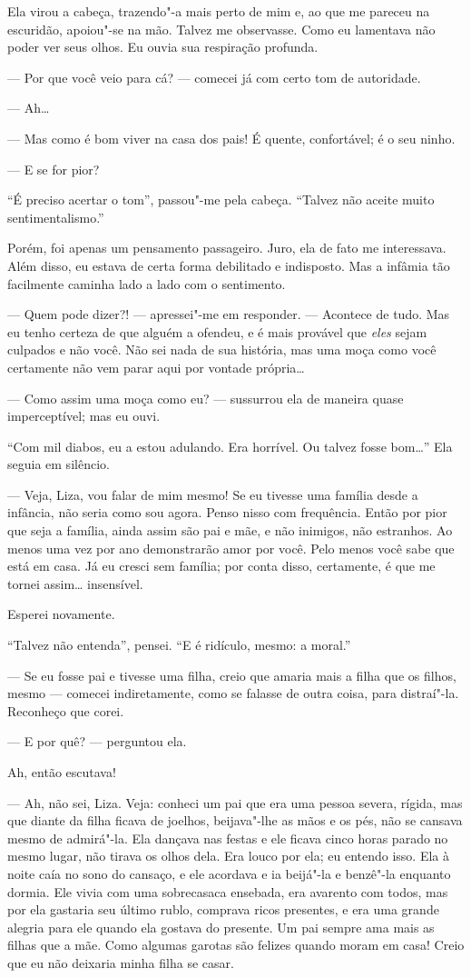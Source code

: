 Ela virou a cabeça, trazendo"-a mais perto de mim e, ao que me pareceu na
escuridão, apoiou"-se na mão. Talvez me observasse. Como eu lamentava
não poder ver seus olhos. Eu ouvia sua respiração profunda.

--- Por que você veio para cá? --- comecei já com certo tom de autoridade.

--- Ah\ldots{}

--- Mas como é bom viver na casa dos pais! É quente, confortável; é o seu
ninho.

--- E se for pior?

“É preciso acertar o tom”, passou"-me pela cabeça. “Talvez não aceite
muito sentimentalismo.”

Porém, foi apenas um pensamento passageiro. Juro, ela de fato me
interessava. Além disso, eu estava de certa forma debilitado e
indisposto. Mas a infâmia tão facilmente caminha lado a lado com o
sentimento.

--- Quem pode dizer?! --- apressei{}"-me em responder. --- Acontece de tudo.
Mas eu tenho certeza de que alguém a ofendeu, e é mais provável que
\textit{eles} sejam culpados e não você. Não sei nada de sua história,
mas uma moça como você certamente não vem parar aqui por vontade
própria\ldots{}

--- Como assim uma moça como eu? --- sussurrou ela de maneira quase
imperceptível; mas eu ouvi.

“Com mil diabos, eu a estou adulando. Era horrível. Ou talvez fosse
bom\ldots{}” Ela seguia em silêncio.

--- Veja, Liza, vou falar de mim mesmo! Se eu tivesse uma família desde a
infância, não seria como sou agora. Penso nisso com frequência. Então
por pior que seja a família, ainda assim são pai e mãe, e não inimigos,
não estranhos. Ao menos uma vez por ano demonstrarão amor por você.
Pelo menos você sabe que está em casa. Já eu cresci sem família; por
conta disso, certamente, é que me tornei assim\ldots{} insensível.

Esperei novamente.

“Talvez não entenda”, pensei. “E é ridículo, mesmo: a moral.”

--- Se eu fosse pai e tivesse uma filha, creio que amaria mais a filha que
os filhos, mesmo --- comecei indiretamente, como se falasse de outra
coisa, para distraí"-la. Reconheço que corei.

--- E por quê? --- perguntou ela.

Ah, então escutava!

--- Ah, não sei, Liza. Veja: conheci um pai que era uma pessoa severa,
rígida, mas que diante da filha ficava de joelhos, beijava"-lhe as mãos
e os pés, não se cansava mesmo de admirá"-la. Ela dançava nas festas e
ele ficava cinco horas parado no mesmo lugar, não tirava os olhos dela.
Era louco por ela; eu entendo isso. Ela à noite caía no sono do
cansaço, e ele acordava e ia beijá"-la e benzê"-la enquanto dormia. Ele
vivia com uma sobrecasaca ensebada, era avarento com todos, mas por ela
gastaria seu último rublo, comprava ricos presentes, e era uma grande
alegria para ele quando ela gostava do presente. Um pai sempre ama mais
as filhas que a mãe. Como algumas garotas são felizes quando moram em
casa! Creio que eu não deixaria minha filha se casar.

